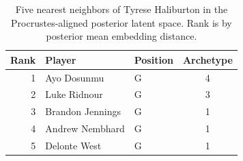 \begin{table}[htbp]
  \centering\small
  \begin{tabular}{rllc}
    \toprule
    Rank & Player & Position & Archetype \\
    \midrule
    1 & Ayo Dosunmu & G & 4 \\
    2 & Luke Ridnour & G & 3 \\
    3 & Brandon Jennings & G & 1 \\
    4 & Andrew Nembhard & G & 1 \\
    5 & Delonte West & G & 1 \\
    \bottomrule
  \end{tabular}
  \caption{Five nearest neighbors of Tyrese Haliburton in the Procrustes-aligned posterior latent space. Rank is by posterior mean embedding distance.}
  \label{tab:Tyrese_Haliburton_neighbors}
\end{table}

